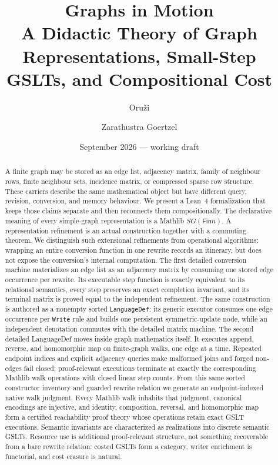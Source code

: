 \documentclass[11pt]{article}
\title{Graphs in Motion\\
\large A Didactic Theory of Graph Representations, Small-Step GSLTs,
and Compositional Cost}
\author{Oru\v{z}i \and Zarathustra Goertzel}
\date{September 2026 --- working draft}
\theoremstyle{remark}
\newcommand{\code}[1]{\texttt{#1}}
\newcommand{\Fin}{\mathsf{Fin}}
\begin{document}
\maketitle

\begin{abstract}
A finite graph may be stored as an edge list, adjacency matrix, family of
neighbour rows, finite neighbour sets, incidence matrix, or compressed sparse
row structure.  These carriers describe the same mathematical object but have
different query, revision, conversion, and memory behaviour.  We present a
Lean~4 formalization that keeps those claims separate and then reconnects them
compositionally.  The declarative meaning of every simple-graph
representation is a Mathlib \(SG(\Fin n)\).  A representation refinement is
an actual construction together with a commuting theorem.  We distinguish
such extensional refinements from operational algorithms: wrapping an entire
conversion function in one rewrite records an itinerary, but does not expose
the conversion's internal computation.  The first detailed conversion machine
materializes an edge list as an adjacency matrix by consuming one stored edge
occurrence per rewrite.  Its executable step function is exactly equivalent to
its relational semantics, every step preserves an exact completion invariant,
and its terminal matrix is proved equal to the independent refinement.
The same construction is authored as a nonempty sorted \code{LanguageDef}:
its generic executor consumes one edge occurrence per \code{Write} rule and
builds one persistent symmetric-update node, while an independent denotation
commutes with the detailed matrix machine.
The second detailed LanguageDef moves inside graph mathematics itself.  It
executes append, reverse, and homomorphic map on finite-graph walks, one edge
at a time.  Repeated endpoint indices and explicit adjacency queries make
malformed joins and forged non-edges fail closed; proof-relevant executions
terminate at exactly the corresponding Mathlib walk operations with closed
linear step counts.  From this same sorted constructor inventory and guarded
rewrite relation we generate an endpoint-indexed native walk judgment.  Every
Mathlib walk inhabits that judgment, canonical encodings are injective, and
identity, composition, reversal, and homomorphic map form a certified
reachability proof theory whose operations retain exact GSLT executions.
Semantic invariants are characterized as realizations into discrete semantic
GSLTs.  Resource use is additional proof-relevant structure, not something
recoverable from a bare rewrite relation: costed GSLTs form a category, writer
enrichment is functorial, and cost erasure is natural.


\end{abstract}
\end{document}
